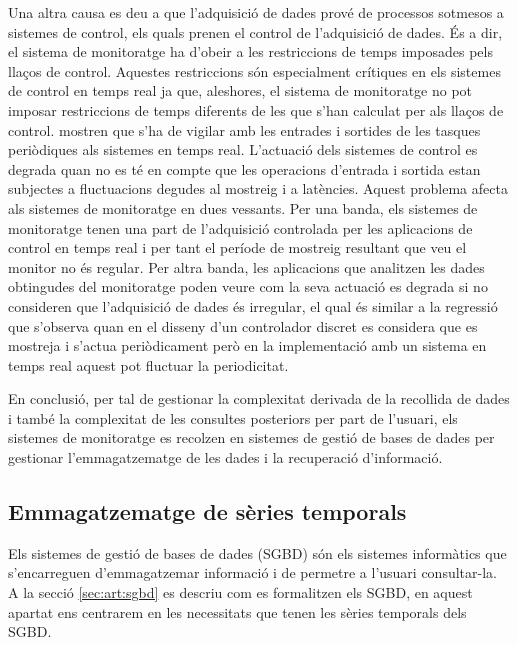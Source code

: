 Una altra causa es deu a que l'adquisició de dades prové de processos sotmesos a sistemes de control, els quals prenen el control de l'adquisició de dades. És a dir, el sistema de monitoratge ha d'obeir a les restriccions de temps imposades pels llaços de control. Aquestes restriccions són especialment crítiques en els sistemes de control en temps real ja que, aleshores, el sistema de monitoratge no pot imposar restriccions de temps diferents de les que s'han calculat per als llaços de control.  \textcite{lozoya08} mostren que s'ha de vigilar amb les entrades i sortides de les tasques periòdiques als sistemes en temps real. L'actuació dels sistemes de control es degrada quan no es té en compte que les operacions d'entrada i sortida estan subjectes a fluctuacions degudes al mostreig i a latències. Aquest problema afecta als sistemes de monitoratge en dues vessants.
Per una banda, els sistemes de monitoratge tenen una part de l'adquisició controlada per les aplicacions de control en temps real i per tant el període de mostreig resultant que veu el monitor no és regular. 
Per altra banda, les aplicacions que analitzen les dades obtingudes del monitoratge poden veure com la seva actuació es degrada si no consideren que l'adquisició de dades és irregular, el qual és similar a la regressió que s'observa \parencite{lozoya08} quan en el disseny d'un controlador discret es considera que es mostreja i s'actua periòdicament però en la implementació amb un sistema en temps real aquest pot fluctuar la periodicitat.




En conclusió, per tal de gestionar la complexitat derivada de la recollida de dades i també la complexitat de les consultes posteriors per part de l'usuari, els sistemes de monitoratge es recolzen en sistemes de gestió de bases de dades per gestionar l'emmagatzematge de les dades i la recuperació d'informació.




\subsection{Emmagatzematge de sèries temporals}


Els sistemes de gestió de bases de dades (SGBD) són els sistemes informàtics que s'encarreguen d'emmagatzemar informació i de permetre a l'usuari consultar-la. A la secció \ref{sec:art:sgbd} es descriu com es formalitzen els SGBD, en aquest apartat ens centrarem en les necessitats que tenen les sèries temporals dels SGBD.


